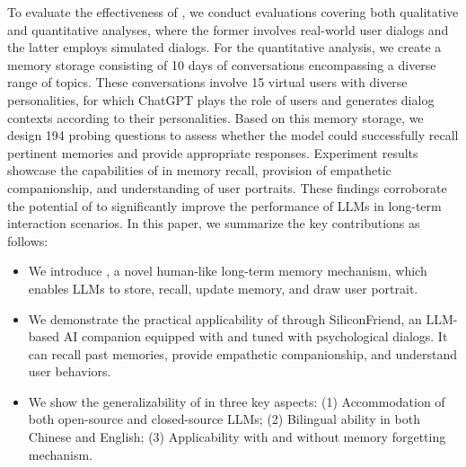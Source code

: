 To evaluate the effectiveness of \method, we conduct evaluations covering both qualitative and quantitative analyses, where the former involves real-world user dialogs and the latter employs simulated dialogs.
For the quantitative analysis, we create a memory storage consisting of 10 days of conversations encompassing a diverse range of topics. These conversations involve 15 virtual users with diverse personalities, for which ChatGPT plays the role of users and generates dialog contexts according to their personalities. 
Based on this memory storage, we design 194 probing questions to assess whether the model could successfully recall pertinent memories and provide appropriate responses.
Experiment results showcase the capabilities of \chatbot in memory recall, provision of empathetic companionship, and understanding of user portraits. These findings corroborate the potential of \method to significantly improve the performance of LLMs in long-term interaction scenarios.
In this paper, we summarize the key contributions as follows:
\begin{itemize} [topsep=0pt,itemsep=0pt,partopsep=0pt,parsep=0pt,leftmargin=20pt]
    \item We introduce \method, a novel human-like long-term memory mechanism, which enables LLMs to store, recall, update memory, and draw user portrait.
    \item We demonstrate the practical applicability of \method through SiliconFriend, an LLM-based AI companion equipped with \method and tuned with psychological dialogs. 
    It can recall past memories, provide empathetic companionship, and understand user behaviors.

    \item We show the generalizability of \method in three key aspects: (1) Accommodation of both open-source and closed-source LLMs; (2) Bilingual ability in both Chinese and English; (3) Applicability with and without memory forgetting mechanism.
\end{itemize}

